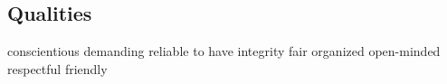 \subsection*{Qualities}
   {conscientious}
   {demanding}
   {reliable}
   {to have integrity}
   {fair}
   {organized}
   {open-minded}
   {respectful}
   {friendly}
